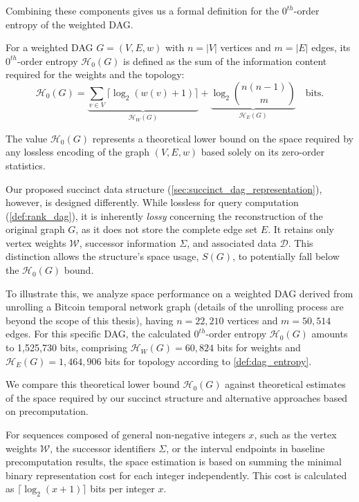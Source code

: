 Combining these components gives us a formal definition for the $0^{th}$-order entropy of the weighted DAG.

\begin{definition}
    \label{def:dag_entropy}
    For a weighted DAG $G = (V, E, w)$ with $n=|V|$ vertices and $m=|E|$ edges, its $0^{th}$-order entropy $\mathcal{H}_0(G)$ is defined as the sum of the information content required for the weights and the topology:
    \[ \mathcal{H}_0(G) = \underbrace{\sum_{v \in V} \lceil \log_2 (w(v)+1) \rceil}_{\mathcal{H}_W(G)} + \underbrace{\log_2 \binom{n(n-1)}{m}}_{\mathcal{H}_E(G)} \quad \text{bits}. \]
\end{definition}

The value $\mathcal{H}_0(G)$ represents a theoretical lower bound on the space required by any lossless encoding of the graph $(V, E, w)$ based solely on its zero-order statistics.

Our proposed succinct data structure (\autoref{sec:succinct_dag_representation}), however, is designed differently. While lossless for \Rank{} query computation (\ref{def:rank_dag}), it is inherently \emph{lossy} concerning the reconstruction of the original graph $G$, as it does not store the complete edge set $E$. It retains only vertex weights $\mathcal{W}$, successor information $\Sigma$, and associated data $\mathcal{D}$. This distinction allows the structure's space usage, $S(G)$, to potentially fall below the $\mathcal{H}_0(G)$ bound.

To illustrate this, we analyze space performance on a weighted DAG derived from unrolling a Bitcoin temporal network graph \cite{kumar2018rev2} (details of the unrolling process are beyond the scope of this thesis), having $n = 22,210$ vertices and $m = 50,514$ edges. For this specific DAG, the calculated $0^{th}$-order entropy $\mathcal{H}_0(G)$ amounts to 1,525,730 bits, comprising $\mathcal{H}_W(G) = 60,824$ bits for weights and $\mathcal{H}_E(G) = 1,464,906$ bits for topology according to \ref{def:dag_entropy}.

We compare this theoretical lower bound $\mathcal{H}_0(G)$ against theoretical estimates of the space required by our succinct structure and alternative approaches based on precomputation.

For sequences composed of general non-negative integers $x$, such as the vertex weights $\mathcal{W}$, the successor identifiers $\Sigma$, or the interval endpoints in baseline precomputation results, the space estimation is based on summing the minimal binary representation cost for each integer independently. This cost is calculated as $\lceil \log_2(x+1) \rceil$ bits per integer $x$.

